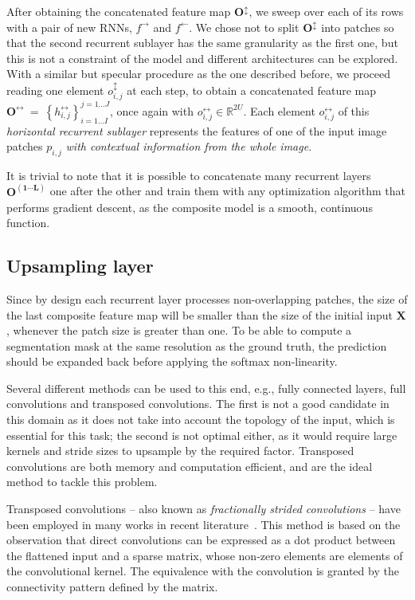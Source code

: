 \documentclass[times,art10,twocolumn,latex8]{article}
\newcommand{\RR}[0]{\mathbb{R}}
\begin{document}
After obtaining the concatenated feature map $\mathbf{O^{\updownarrow}}$, we
sweep over each of its rows with a pair of new RNNs, $f^{\rightarrow}$ and
$f^{\leftarrow}$. We chose not to split $\mathbf{O^{\updownarrow}}$ into
patches so that the second recurrent sublayer has the same granularity as the
first one, but this is not a constraint of the model and different
architectures can be explored.  With a similar but specular procedure as the
one described before, we proceed reading one element $o^\updownarrow_{i,j}$ at
each step, to obtain a concatenated feature map
$\mathbf{O^\leftrightarrow}~=~\left\{ h^\leftrightarrow_{i,j} \right\}
_{i=1\dots I}^{j=1\dots J}$, once again with $o^\leftrightarrow_{i,j} \in
\RR^{2U}$. Each element $o^\leftrightarrow_{i,j}$ of this \emph{horizontal
recurrent sublayer} represents the features of one of the input image patches
$p_{i,j}$ \emph{with contextual information from the whole image}.

It is trivial to note that it is possible to concatenate many recurrent layers
$\mathbf{O^{(1 \cdots L)}}$ one after the other and train them with any
optimization algorithm that performs gradient descent, as the composite model
is a smooth, continuous function.

\subsection{Upsampling layer}\label{sec:upsampling}
Since by design each recurrent layer processes non-overlapping patches, the
size of the last composite feature map will be smaller than the size of the
initial input $\mathbf{X}$, whenever the patch size is greater than one. To be
able to compute a segmentation mask at the same resolution as the ground truth,
the prediction should be expanded back before applying the softmax non-linearity.

Several different methods can be used to this end, e.g., fully connected
layers, full convolutions and transposed convolutions. The first is not a good
candidate in this domain as it does not take into account the topology of the
input, which is essential for this task; the second is not optimal either, as
it would require large kernels and stride sizes to upsample by the
required factor. Transposed convolutions are both memory and
computation efficient, and are the ideal method to tackle this problem.

Transposed convolutions -- also known as \emph{fractionally strided
convolutions} -- have been employed in many works in recent
literature~\cite{Zeiler-ICCV2011,ZeilerFergus14,long2015fully,
radford2015unsupervised,im2016generating}. This method is based on the observation
that direct convolutions can be expressed as a dot product between the
flattened input and a sparse matrix, whose non-zero elements are elements of the
convolutional kernel. The equivalence with the convolution is granted by the
connectivity pattern defined by the matrix.
\end{document}
